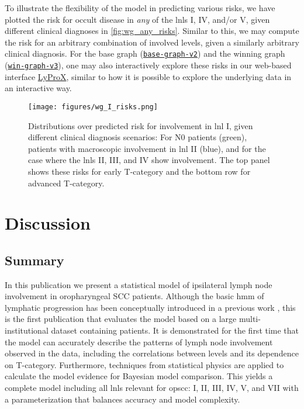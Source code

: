 \documentclass[twocolumn]{aastex631}
\begin{document}
To illustrate the flexibility of the model in predicting various risks, we have plotted the risk for occult disease in \textit{any} of the \glspl{lnl} I, IV, and/or V, given different clinical diagnoses in \autoref{fig:wg_any_risks}. Similar to this, we may compute the risk for an arbitrary combination of involved levels, given a similarly arbitrary clinical diagnosis. For the base graph (\href{https://lyprox.org/riskpredictor/9}{\texttt{base-graph-v2}}) and the winning graph (\href{https://lyprox.org/riskpredictor/8}{\texttt{win-graph-v3}}), one may also interactively explore these risks in our web-based interface \href{https://lyprox.org/riskpredictor/list}{LyProX}, similar to how it is possible to explore the underlying data in an interactive way.

\clearpage

\begin{figure}
    \begin{centering}
        \texttt{[image: figures/wg\_I\_risks.png]}
        \caption{Distributions over predicted risk for involvement in \gls{lnl} I, given different clinical diagnosis scenarios: For N0 patients (green), patients with macroscopic involvement in \gls{lnl} II (blue), and for the case where the \glspl{lnl} II, III, and IV show involvement. The top panel shows these risks for early T-category and the bottom row for advanced T-category. \label{fig:wg_I_risks}}
    \end{centering}
\end{figure}


\section{Discussion}
\label{sec:discussion}

\subsection{Summary} 

In this publication we present a statistical model of ipsilateral lymph node involvement in oropharyngeal SCC patients. Although the basic \gls{hmm} of lymphatic progression has been conceptually introduced in a previous work \citep{ludwig_hidden_2021}, this is the first publication that evaluates the model based on a large multi-institutional dataset containing patients. It is demonstrated for the first time that the model can accurately describe the patterns of lymph node involvement observed in the data, including the correlations between levels and its dependence on T-category. Furthermore, techniques from statistical physics are applied to calculate the model evidence for Bayesian model comparison. This yields a complete model including all \glspl{lnl} relevant for \gls{opscc}: I, II, III, IV, V, and VII with a parameterization that balances accuracy and model complexity. 
\end{document}

